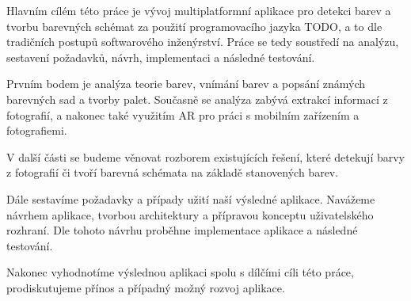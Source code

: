 Hlavním cílém této práce je vývoj multiplatformní aplikace pro detekci barev a tvorbu barevných schémat
za použití programovacího jazyka TODO, a to dle tradičních postupů softwarového inženýrství. Práce se tedy soustředí
na analýzu, sestavení požadavků, návrh, implementaci a následné testování.

Prvním bodem je analýza teorie barev, vnímání barev a popsání známých barevných sad a tvorby palet.
Současně se analýza zabývá extrakcí informací z fotografií, a nakonec také využitím AR pro práci s 
mobilním zařízením a fotografiemi.

V další části se budeme věnovat rozborem existujících řešení, které detekují barvy z fotografií či tvoří barevná schémata 
na základě stanovených barev.

Dále sestavíme požadavky a případy užití naší výsledné aplikace. Navážeme návrhem aplikace, tvorbou architektury a přípravou konceptu
uživatelského rozhraní. Dle tohoto návrhu proběhne implementace aplikace a následné testování.

Nakonec vyhodnotíme výslednou aplikaci spolu s dílčími cíli této práce, prodiskutujeme přínos a případný možný rozvoj aplikace.
